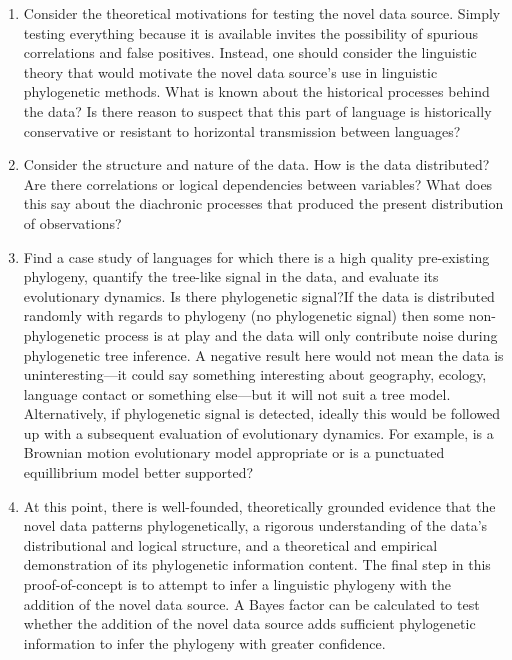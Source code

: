 \begin{enumerate}
\def\labelenumi{\arabic{enumi}.}
\item
  Consider the theoretical motivations for testing the novel data source. Simply testing everything because it is available invites the possibility of spurious correlations and false positives. Instead, one should consider the linguistic theory that would motivate the novel data source's use in linguistic phylogenetic methods. What is known about the historical processes behind the data? Is there reason to suspect that this part of language is historically conservative or resistant to horizontal transmission between languages?
\item
  Consider the structure and nature of the data. How is the data distributed? Are there correlations or logical dependencies between variables? What does this say about the diachronic processes that produced the present distribution of observations?
\item
  Find a case study of languages for which there is a high quality pre-existing phylogeny, quantify the tree-like signal in the data, and evaluate its evolutionary dynamics. Is there phylogenetic signal?If the data is distributed randomly with regards to phylogeny (no phylogenetic signal) then some non-phylogenetic process is at play and the data will only contribute noise during phylogenetic tree inference. A negative result here would not mean the data is uninteresting---it could say something interesting about geography, ecology, language contact or something else---but it will not suit a tree model. Alternatively, if phylogenetic signal is detected, ideally this would be followed up with a subsequent evaluation of evolutionary dynamics. For example, is a Brownian motion evolutionary model appropriate or is a punctuated equillibrium model better supported?
\item
  At this point, there is well-founded, theoretically grounded evidence that the novel data patterns phylogenetically, a rigorous understanding of the data's distributional and logical structure, and a theoretical and empirical demonstration of its phylogenetic information content. The final step in this proof-of-concept is to attempt to infer a linguistic phylogeny with the addition of the novel data source. A Bayes factor can be calculated to test whether the addition of the novel data source adds sufficient phylogenetic information to infer the phylogeny with greater confidence.
\end{enumerate}

